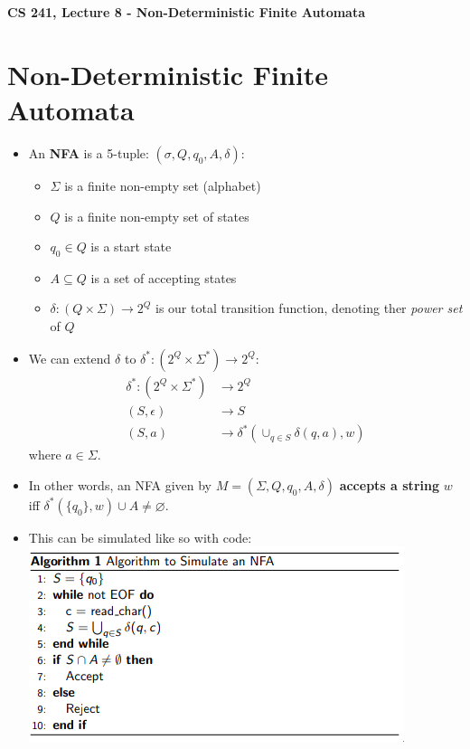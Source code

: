\documentclass[12pt]{article}
\author{Clement Tsang}
\begin{document}
\begin{center}
\Large\textbf{CS 241, Lecture 8 - Non-Deterministic Finite Automata}
\end{center}

\section{Non-Deterministic Finite Automata}
\begin{itemize}
    \item An \textbf{NFA} is a 5-tuple: $(\sigma, Q, q_0, A, \delta)$:
        \begin{itemize}
            \item $\Sigma$ is a finite non-empty set (alphabet)
            \item $Q$ is a finite non-empty set of states
            \item $q_0 \in Q$ is a start state
            \item $A \subseteq Q$ is a set of accepting states
            \item $\delta : (Q \times \Sigma) \rightarrow 2^Q$ is our total transition function, denoting ther \emph{power set} of $Q$
        \end{itemize}
    \item We can extend $\delta$ to $\delta^* : (2^Q \times \Sigma^*) \rightarrow 2^Q$:
        \begin{align*}
            \delta^* : (2^Q \times \Sigma^*) &\rightarrow 2^Q \\
            (S, \epsilon) &\rightarrow S \\
            (S, a) &\rightarrow \delta^* (\cup_{q\in S} \delta (q, a), w)
        \end{align*}
        where $a \in \Sigma$.  
    \item In other words, an NFA given by $M = (\Sigma, Q, q_0, A, \delta)$ \textbf{accepts a string} $w$ iff $\delta^* (\{q_0\}, w) \cup A \not= \varnothing$.
    \item This can be simulated like so with code:\\
        \includegraphics[scale=0.8]{nfa_simulate.png}

\end{itemize}
\end{document}
